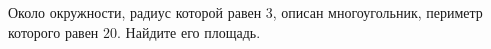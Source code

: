\begin{ex}
	\begin{condition}
		Около окружности, радиус которой равен \( 3 \), описан многоугольник, периметр которого равен \( 20 \). Найдите его площадь.
	\end{condition}
\end{ex}